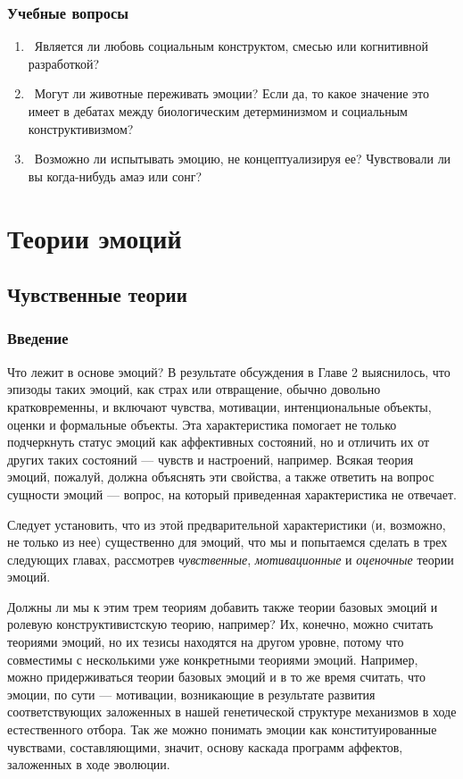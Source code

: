 \documentclass[11pt]{book}
\begin{document}
\begin{tcolorbox}
\section{Учебные вопросы}
  \begin{enumerate}
    \item\ Является ли любовь социальным конструктом, смесью или когнитивной разработкой?
    \item\ Могут ли животные переживать эмоции? Если да, то какое значение это имеет в дебатах между биологическим детерминизмом и социальным конструктивизмом?
    \item\ Возможно ли испытывать эмоцию, не концептуализируя ее? Чувствовали ли вы когда-нибудь амаэ или сонг?
  \end{enumerate}
\end{tcolorbox}

\part{Теории эмоций}

\chapter{Чувственные теории}

\section{Введение}

Что лежит в основе эмоций? В результате обсуждения в Главе 2 выяснилось, что эпизоды таких эмоций, как страх или отвращение, обычно довольно кратковременны, и включают чувства, мотивации, интенциональные объекты, оценки и формальные объекты. Эта характеристика помогает не только подчеркнуть статус эмоций как аффективных состояний, но и отличить их от других таких состояний --- чувств и настроений, например. Всякая теория эмоций, пожалуй, должна объяснять эти свойства, а также ответить на вопрос сущности эмоций --- вопрос, на который приведенная характеристика не отвечает.

Следует установить, что из этой предварительной характеристики (и, возможно, не только из нее) существенно для эмоций, что мы и попытаемся сделать в трех следующих главах, рассмотрев \textit{чувственные}, \textit{мотивационные} и \textit{оценочные} теории эмоций.

Должны ли мы к этим трем теориям добавить также теории базовых эмоций и ролевую конструктивистскую теорию, например? Их, конечно, можно считать теориями эмоций, но их тезисы находятся на другом уровне, потому что совместимы с несколькими уже конкретными теориями эмоций. Например, можно придерживаться теории базовых эмоций и в то же время считать, что эмоции, по сути --- мотивации, возникающие в результате развития соответствующих заложенных в нашей генетической структуре механизмов в ходе естественного отбора. Так же можно понимать эмоции как конституированные чувствами, составляющими, значит, основу каскада программ аффектов, заложенных в ходе эволюции.
\end{document}
